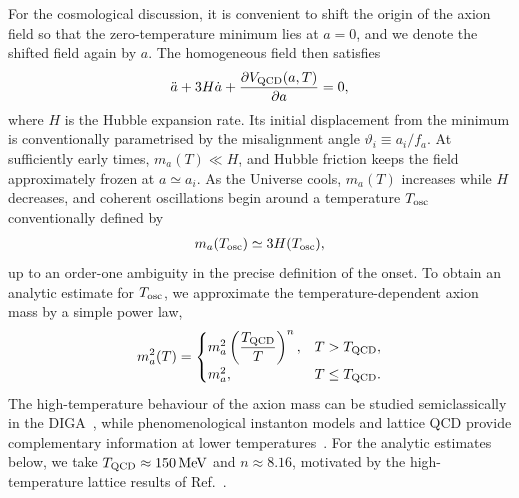 \documentclass[review]{elsarticle}
\numberwithin{equation}{section}
\numberwithin{table}{section}
\numberwithin{figure}{section}
\begin{document}
For the cosmological discussion, it is convenient to shift the origin of the axion field so that the zero-temperature minimum lies at $a=0$, and we denote the shifted field again by $a$. The homogeneous field then satisfies
\begin{align}
    \ddot a
    +
    3H\dot a
    +
    \frac{\partial V_{\rm QCD}(a,T)}
         {\partial a}
    =
    0,
    \label{eq:axion-cosmological-eom}
\end{align}
where $H$ is the Hubble expansion rate. Its initial displacement from the minimum is conventionally parametrised by the misalignment angle $\vartheta_i\equiv a_i/f_a$. At sufficiently early times, $m_a(T)\ll H$, and Hubble friction keeps the field approximately frozen at $a\simeq a_i$. As the Universe cools, $m_a(T)$ increases while $H$ decreases, and coherent oscillations begin around a temperature $T_{\rm osc}$ conventionally defined by
\begin{align}
    m_a(T_{\rm osc})
    \simeq
    3H(T_{\rm osc}),
    \label{eq:axion-oscillation-condition}
\end{align}
up to an order-one ambiguity in the precise definition of the onset. To obtain an analytic estimate for $T_{\rm osc}$, we approximate the temperature-dependent axion mass by a simple power law,
\begin{align}
    m_a^2(T) =
    \begin{cases}
        m_a^2\left(\dfrac{T_{\rm QCD}}{T}\right)^n, & T>T_{\rm QCD},\\
        m_a^2, & T\leq T_{\rm QCD}.
    \end{cases}
    \label{eq:ma2T}
\end{align}
The high-temperature behaviour of the axion mass can be studied semiclassically in the DIGA~\cite{Gross:1980br}, while phenomenological instanton models and lattice QCD provide complementary information at lower temperatures~\cite{Wantz:2009it,Bonati:2015vqz,Petreczky:2016vrs,Borsanyi:2016ksw,Chen:2022fid,Athenodorou:2022aay}. For the analytic estimates below, we take $T_{\rm QCD}\approx 150\,{\rm MeV}$ and $n\approx 8.16$, motivated by the high-temperature lattice results of Ref.~\cite{Borsanyi:2016ksw}.
\end{document}
